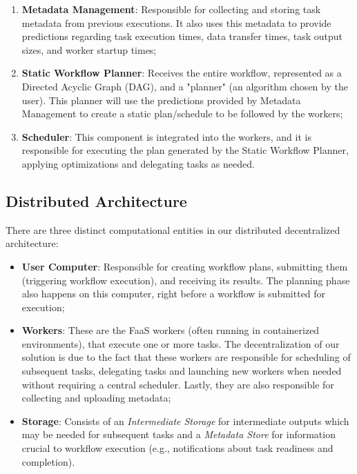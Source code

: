 \documentclass[conference]{IEEEtran}
\begin{document}
\begin{enumerate}
    \item \textbf{Metadata Management}: Responsible for collecting and storing task metadata from previous executions. It also uses this metadata to provide predictions regarding task execution times, data transfer times, task output sizes, and worker startup times;
    \item \textbf{Static Workflow Planner}: Receives the entire workflow, represented as a Directed Acyclic Graph (DAG), and a "planner" (an algorithm chosen by the user). This planner will use the predictions provided by Metadata Management to create a static plan/schedule to be followed by the workers;
    \item \textbf{Scheduler}: This component is integrated into the workers, and it is responsible for executing the plan generated by the Static Workflow Planner, applying optimizations and delegating tasks as needed.
\end{enumerate}

\subsection{Distributed Architecture}

There are three distinct computational entities in our distributed decentralized architecture:

\begin{itemize}
    \item \textbf{User Computer}: Responsible for creating workflow plans, submitting them (triggering workflow execution), and receiving its results. The planning phase also happens on this computer, right before a workflow is submitted for execution;
    \item \textbf{Workers}: These are the FaaS workers (often running in containerized environments), that execute one or more tasks. The decentralization of our solution is due to the fact that these workers are responsible for scheduling of subsequent tasks, delegating tasks and launching new workers when needed without requiring a central scheduler. Lastly, they are also responsible for collecting and uploading metadata;
    \item \textbf{Storage}: Consists of an \textit{Intermediate Storage} for intermediate outputs which may be needed for subsequent tasks and a \textit{Metadata Store} for information crucial to workflow execution (e.g., notifications about task readiness and completion).
\end{itemize}
\end{document}
